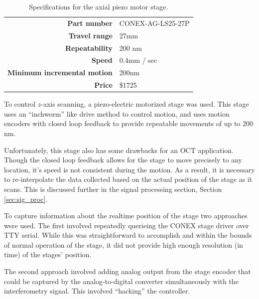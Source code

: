 \begin{table}[h!]
\centering
\begin{tabular}{ >{\bf}r | l}
Part number & CONEX-AG-LS25-27P\\
Travel range & 27mm  \\
Repeatability & 200 nm \\
Speed & 0.4mm / sec \\
Minimum incremental motion & 200nm \\
Price & \$1725 \\
\end{tabular}
\caption{Specifications for the axial piezo motor stage.}
\end{table}

To control $z$-axis scanning, a piezo-electric motorized stage was used. This stage uses an ``inchworm'' like drive method to control motion, and uses motion encoders with closed loop feedback to provide repeatable movements of up to 200 nm.

Unfortunately, this stage also has some drawbacks for an OCT application. Though the closed loop feedback allows for the stage to move precisely to any location, it's speed is not consistent during the motion. As a result, it is necessary to re-interpolate the data collected based on the actual position of the stage as it scans. This is discussed further in the signal processing section, Section \ref{sec:sig_proc}.

To capture information about the realtime position of the stage two approaches were used. The first involved repeatedly querieing the CONEX stage driver over TTY serial. While this was straightforward to accomplish and within the bounds of normal operation of the stage, it did not provide high enough resolution (in time) of the stages' position.

The second approach involved adding analog output from the stage encoder that could be captured by the analog-to-digital converter simultaneously with the interferometry signal. This involved ``hacking'' %
the controller.


